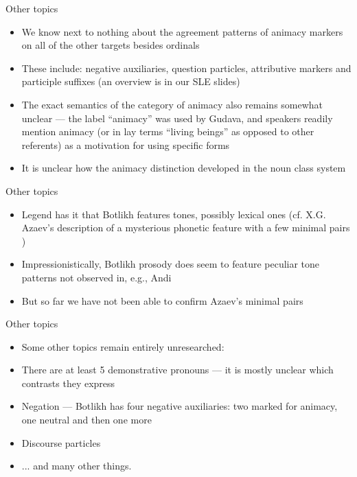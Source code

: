 \begin{frame}{Other topics}
\begin{itemize}
    \item We know next to nothing about the agreement patterns of animacy markers on all of the other targets besides ordinals
    \item These include: negative auxiliaries, question particles, attributive markers and participle suffixes (an overview is in our SLE slides)
    \item The exact semantics of the category of animacy also remains somewhat unclear --- the label ``animacy'' was used by Gudava, and speakers readily mention animacy (or in lay terms ``living beings'' as opposed to other referents) as a motivation for using specific forms
    \item It is unclear how the animacy distinction developed in the noun class system
\end{itemize}
\end{frame}

\begin{frame}{Other topics}
\begin{itemize}
    \item Legend has it that Botlikh features tones, possibly lexical ones (cf. X.G. Azaev's description of a mysterious phonetic feature with a few minimal pairs \citep[348]{azaev2000})
    \item Impressionistically, Botlikh prosody does seem to feature peculiar tone patterns not observed in, e.g., Andi
    \item But so far we have not been able to confirm Azaev's minimal pairs
\end{itemize}
\end{frame}

\begin{frame}{Other topics}
\begin{itemize}
    \item Some other topics remain entirely unresearched:
    \item There are at least 5 demonstrative pronouns --- it is mostly unclear which contrasts they express
    \item Negation --- Botlikh has four negative auxiliaries: two marked for animacy, one neutral and then one more
    \item Discourse particles
    \pause
    \item ... and many other things.
\end{itemize}
\end{frame}

